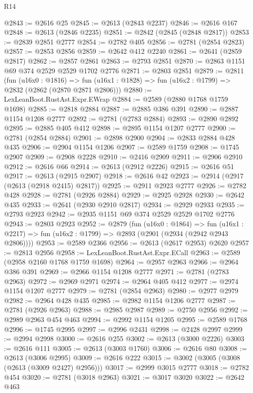 \begin{lexlean}{R14}
\begin{coremodule}
@2843 := @2616 @25
@2845 := @2613 (@2843 @2237)
@2846 := @2616 @167
@2848 := @2613 (@2846 @2235)
@2851 := @2842 (@2845 (@2848 @2817))
@2853 := @2839 @2851 @2777
@2854 := @2782 @405
@2856 := @2781 (@2854 @2823)
@2857 := @2853 @2856
@2859 := @2642 @412 @2240
@2861 := @2641 (@2859 @2817)
@2862 := @2857 @2861
@2863 := @2793 @2851
@2870 := @2863 @1151 @69 @374 @2529 @2529 @1702 @2776
@2871 := @2803 @2851
@2879 := @2811
    (fun (u16x0 : @1816) =>
    fun (u16x1 : @1828) => fun (u16x2 : @1799) => @2832 (@2862 (@2870 @2871 @2806)))
@2880 := LexLeanBoot.RustAst.Expr.EWrap
@2884 := @2589 (@2880 @1768 @1759 @1698)
@2885 := @2818 @2884
@2887 := @2885 @386 @391
@2890 := @2887 @1154 @1208 @2777
@2892 := @2781 (@2783 @2884)
@2893 := @2890 @2892
@2895 := @2885 @405 @412
@2898 := @2895 @1154 @1207 @2777
@2900 := @2781 (@2854 @2884)
@2901 := @2898 @2900
@2904 := @2833 @2884 @428 @435
@2906 := @2904 @1154 @1206
@2907 := @2589 @1759
@2908 := @1745 @2907
@2909 := @2908 @2228
@2910 := @2416 @2909
@2911 := @2906 @2910
@2912 := @2616 @66
@2914 := @2613 (@2912 @2226)
@2915 := @2616 @51
@2917 := @2613 (@2915 @2907)
@2918 := @2616 @42
@2923 := @2914 (@2917 (@2613 (@2918 @2415) @2817))
@2925 := @2911 @2923 @2777
@2926 := @2782 @428
@2928 := @2781 (@2926 @2884)
@2929 := @2925 @2928
@2930 := @2642 @435
@2933 := @2641 (@2930 @2910 @2817)
@2934 := @2929 @2933
@2935 := @2793 @2923
@2942 := @2935 @1151 @69 @374 @2529 @2529 @1702 @2776
@2943 := @2803 @2923
@2952 := @2879
    (fun (u16x0 : @1864) =>
    fun (u16x1 : @2217) => fun (u16x2 : @1799) => @2893 (@2901 (@2934 (@2942 @2943 @2806))))
@2953 := @2589 @2366
@2956 := @2613 (@2617 @2953) @2620
@2957 := @2813 @2956
@2958 := LexLeanBoot.RustAst.Expr.ECall
@2963 := @2589 (@2958 @2160 @1768 @1759 @1698)
@2964 := @2957 @2963
@2966 := @2964 @386 @391
@2969 := @2966 @1154 @1208 @2777
@2971 := @2781 (@2783 @2963)
@2972 := @2969 @2971
@2974 := @2964 @405 @412
@2977 := @2974 @1154 @1207 @2777
@2979 := @2781 (@2854 @2963)
@2980 := @2977 @2979
@2982 := @2964 @428 @435
@2985 := @2982 @1154 @1206 @2777
@2987 := @2781 (@2926 @2963)
@2988 := @2985 @2987
@2989 := @2750 @2956
@2992 := @2989 @2963 @454 @463
@2994 := @2992 @1154 @1205
@2995 := @2589 @1768
@2996 := @1745 @2995
@2997 := @2996 @2431
@2998 := @2428 @2997
@2999 := @2994 @2998
@3000 := @2616 @255
@3002 := @2613 (@3000 @2226)
@3003 := @2616 @111
@3005 := @2613 (@3003 @1760)
@3006 := @2616 @80
@3008 := @2613 (@3006 @2995)
@3009 := @2616 @222
@3015 := @3002 (@3005 (@3008 (@2613 (@3009 @2427) @2956)))
@3017 := @2999 @3015 @2777
@3018 := @2782 @454
@3020 := @2781 (@3018 @2963)
@3021 := @3017 @3020
@3022 := @2642 @463

\end{coremodule}
\end{lexlean}
